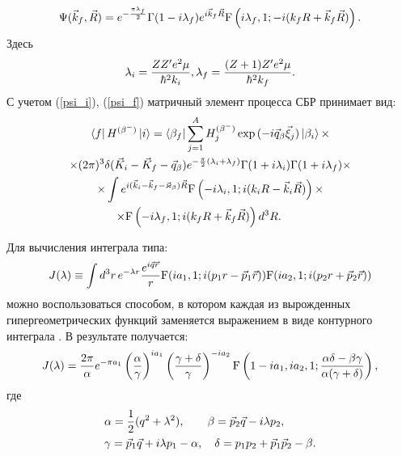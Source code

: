 \documentclass[14pt, a4paper]{article}
\numberwithin{figure}{section}
\numberwithin{equation}{section}
\begin{document}
\begin{eqnarray}\label{psi_f}
\Psi (\vec k_f, \vec R)=e^{-{\pi \lambda_f\over2}} \Gamma(1-i\lambda_f)
e^{i \vec k_f \vec R} {\rm F} \left(i \lambda_f,1;-i(k_f R + \vec k_f \vec R)\right).
\end{eqnarray}
Здесь
\begin{eqnarray}
\lambda_i = {Z Z' e^2 \mu\over \hbar^2 k_i},
\lambda_f = {(Z+1) Z' e^2 \mu\over \hbar^2 k_f}.
\end{eqnarray}
С учетом (\ref{psi_i}), (\ref{psi_f}) матричный элемент процесса СБР принимает вид:
\begin{multline}\label{pred_mat}
\bra{f} H^{(\beta^-)}\ket{i}= \bra{\beta_f }
\sum_{j=1}^A H^{(\beta^-)}_{j}\exp{(-i\vec q_\beta\vec\xi_{j})}
\ket{ \beta_i}\times \\
\times(2\pi)^3 \delta (\vec K_i - \vec K_f - \vec q_\beta)
e^{-{\pi\over 2} (\lambda_i + \lambda_f)} \Gamma{(1+i\lambda_i)}
\Gamma{(1+i\lambda_f)}\times\\
\times\int e^{i(\vec k_i - \vec k_f - \vec \varkappa_\beta)\vec R}
{\rm F} \left(-i \lambda_i,1;i(k_i R - \vec k_i \vec R)\right)\times\\
\times{\rm F} \left(-i \lambda_f,1;i(k_f R + \vec k_f \vec R)\right) d^3 R .\qquad
\end{multline}

Для вычисления интеграла типа:
\begin{equation}\label{def_J}
J(\lambda)\equiv\int d^3 r\, e^{-\lambda r} {e^{i\vec q \vec r}\over r}
{\rm F} (i a_1,1;i(p_1 r - \vec p_1 \vec r))
{\rm F} (i a_2,1;i(p_2 r + \vec p_2 \vec r))
\end{equation}
можно воспользоваться способом, в котором каждая из вырожденных гипергеометрических функций
заменяется выражением в виде контурного интеграла \cite{nord, bess}. В результате
получается:
\begin{equation}\label{rez_J}
J(\lambda)={{2\pi}\over\alpha} e^{-\pi a_1}\left({\alpha\over\gamma}\right)^{i a_1}
\left({{\gamma+\delta}\over\gamma}\right)^{-i a_2}{\rm F}\left(1-i a_1, i a_2,
1;{{\alpha\delta-\beta\gamma}\over{\alpha(\gamma+\delta)}}\right),
\end{equation}
где
\begin{equation*}
\begin{split}
&\alpha={1\over2}(q^2+\lambda^2),\qquad \beta=\vec p_2 \vec q - i \lambda p_2,
\\
&\gamma=\vec p_1 \vec q + i \lambda p_1 - \alpha, \quad \delta=p_1 p_2+
\vec p_1 \vec p_2 -\beta.
\end{split}
\end{equation*}
\end{document}
